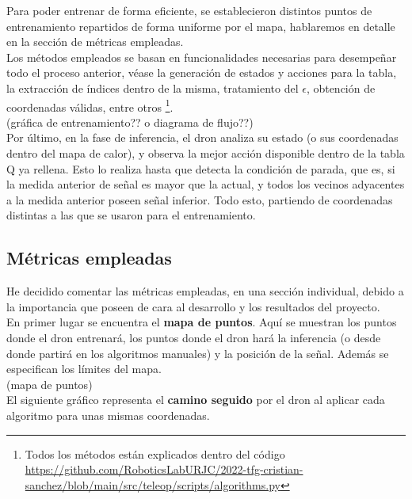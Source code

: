 Para poder entrenar de forma eficiente, se establecieron distintos puntos de entrenamiento repartidos de forma uniforme por el mapa, hablaremos en detalle en la sección de métricas empleadas.\\

Los métodos empleados se basan en funcionalidades necesarias para desempeñar todo el proceso anterior, véase la generación de estados y acciones para la tabla, la extracción de índices dentro de la misma, tratamiento del $\epsilon$, obtención de coordenadas válidas, entre otros \footnote[3]{Todos los métodos están explicados dentro del código \url{https://github.com/RoboticsLabURJC/2022-tfg-cristian-sanchez/blob/main/src/teleop/scripts/algorithms.py}}.\\

(gráfica de entrenamiento?? o diagrama de flujo??)\\

Por último, en la fase de inferencia, el dron analiza su estado (o sus coordenadas dentro del mapa de calor), y observa la mejor acción disponible dentro de la tabla Q ya rellena. Esto lo realiza hasta que detecta la condición de parada, que es, si la medida anterior de señal es mayor que la actual, y todos los vecinos adyacentes a la medida anterior poseen señal inferior. Todo esto, partiendo de coordenadas distintas a las que se usaron para el entrenamiento.\\

\subsection{Métricas empleadas}
\label{subsec:metricas}

He decidido comentar las métricas empleadas, en una sección individual, debido a la importancia que poseen de cara al desarrollo y los resultados del proyecto.\\

En primer lugar se encuentra el \textbf{mapa de puntos}. Aquí se muestran los puntos donde el dron entrenará, los puntos donde el dron hará la inferencia (o desde donde partirá en los algoritmos manuales) y la posición de la señal. Además se especifican los límites del mapa.\\

(mapa de puntos)\\

El siguiente gráfico representa el \textbf{camino seguido} por el dron al aplicar cada algoritmo para unas mismas coordenadas.\\

